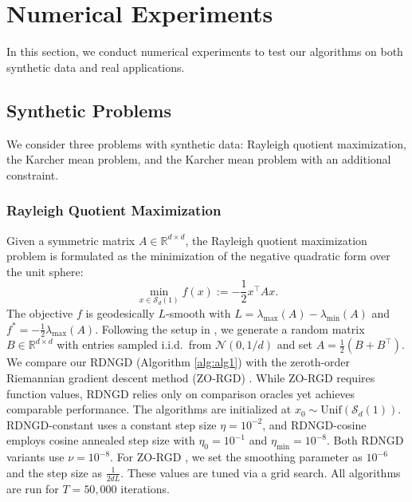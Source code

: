 \documentclass{article}
\theoremstyle{plain}
\theoremstyle{definition}
\theoremstyle{remark}
\newtheorem{remark}[theorem]{Remark}
\begin{document}

\section{Numerical Experiments}

In this section, we conduct numerical experiments to test our algorithms on both synthetic data and real applications.

\subsection{Synthetic Problems}
We consider three problems with synthetic data: Rayleigh quotient maximization, the Karcher mean problem, and the Karcher mean problem with an additional constraint. 

\subsubsection{Rayleigh Quotient Maximization}\label{sec:rayleigh}

Given a symmetric matrix $A \in \mathbb{R}^{d \times d}$, the Rayleigh quotient maximization problem is formulated as the minimization of the negative quadratic form over the unit sphere:
\begin{equation}\label{prob:rayleigh}
    \min_{x \in \mathcal{S}_d(1)} f(x) := -\frac{1}{2} x^\top A x.
\end{equation}
The objective $f$ is geodesically $L$-smooth with $L = \lambda_{\max}(A) - \lambda_{\min}(A)$ \citep{pmlr-v162-kim22k} and $f^* = -\frac{1}{2}\lambda_{\max}(A)$. Following the setup in \cite{pmlr-v162-kim22k}, we generate a random matrix $B \in \mathbb{R}^{d \times d}$ with entries sampled i.i.d.\ from $\mathcal{N}(0, 1/d)$ and set $A = \frac{1}{2}(B + B^\top)$. 
We compare our RDNGD (Algorithm \ref{alg:alg1}) 
with the zeroth-order Riemannian gradient descent method (ZO-RGD) \citep{li2023stochastic}. While ZO-RGD requires function values, RDNGD relies only on comparison oracles yet achieves comparable performance. The algorithms are initialized at $x_0 \sim \mathrm{Unif}(\mathcal{S}_d(1))$. RDNGD-constant uses a constant step size $\eta = 10^{-2}$, and RDNGD-cosine employs cosine annealed step size with $\eta_{0}=10^{-1}$ and $\eta_{\min}=10^{-8}$. 
Both RDNGD variants use $\nu=10^{-8}$. For ZO-RGD \citep{li2023stochastic}, we set the smoothing parameter as $10^{-6}$ and the step size as $\frac{1}{2dL}$. These values are tuned via a grid search. All algorithms are run for $T=50,000$ iterations. 
\end{document}
